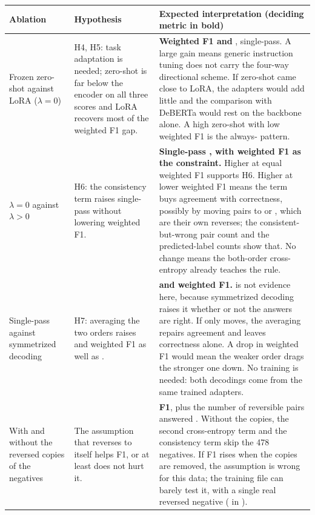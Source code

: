 \begin{table}[H]
\centering
\footnotesize
\begin{tabular}{@{}N{0.15\textwidth}L{0.24\textwidth}L{0.55\textwidth}@{}}
\toprule
Ablation & Hypothesis & Expected interpretation (deciding metric in bold) \\
\midrule
Frozen zero-shot against LoRA ($\lambda = 0$) &
H4, H5: task adaptation is needed; zero-shot is far below the encoder on all three scores and LoRA recovers most of the weighted F1 gap. &
\textbf{Weighted F1 and \HardCons{}}, single-pass. A large gain means generic instruction tuning does not carry the four-way directional scheme. If zero-shot came close to LoRA, the adapters would add little and the comparison with DeBERTa would rest on the backbone alone. A high zero-shot \SoftCons{} with low weighted F1 is the always-\EQ{} pattern. \\
\addlinespace
${\lambda = 0}$ against ${\lambda > 0}$ &
H6: the consistency term raises single-pass \SoftCons{} without lowering weighted F1. &
\textbf{Single-pass \SoftCons{}, with weighted F1 as the constraint.} Higher \SoftCons{} at equal weighted F1 supports H6. Higher \SoftCons{} at lower weighted F1 means the term buys agreement with correctness, possibly by moving pairs to \EQ{} or \NO{}, which are their own reverses; the consistent-but-wrong pair count and the predicted-label counts show that. No change means the both-order cross-entropy already teaches the rule. \\
\addlinespace
Single-pass against symmetrized decoding &
H7: averaging the two orders raises \HardCons{} and weighted F1 as well as \SoftCons{}. &
\textbf{\HardCons{} and weighted F1.} \SoftCons{} is not evidence here, because symmetrized decoding raises it whether or not the answers are right. If only \SoftCons{} moves, the averaging repairs agreement and leaves correctness alone. A drop in weighted F1 would mean the weaker order drags the stronger one down. No training is needed: both decodings come from the same trained adapters. \\
\addlinespace
With and without the reversed copies of the negatives &
The assumption that \NO{} reverses to itself helps \NO{} F1, or at least does not hurt it. &
\textbf{\NO{} F1}, plus the number of reversible pairs answered \NO{}. Without the copies, the second cross-entropy term and the consistency term skip the 478 negatives. If \NO{} F1 rises when the copies are removed, the assumption is wrong for this data; the training file can barely test it, with a single real reversed negative ( in ). \\

\end{tabular}
\end{table}
